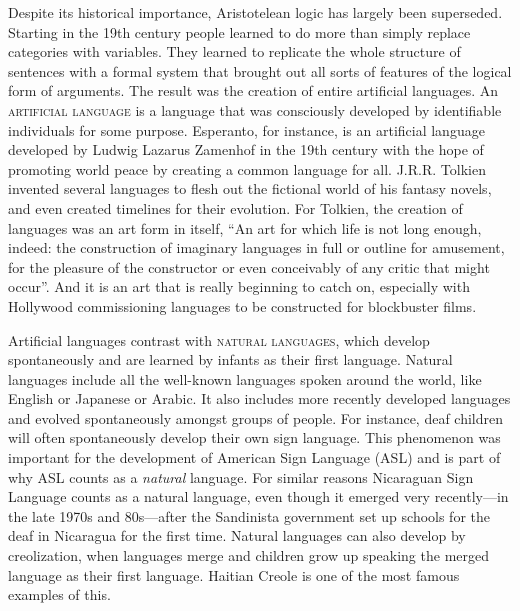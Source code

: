 Despite its historical importance, Aristotelean logic has largely been superseded. Starting in the 19th century people learned to do more than simply replace categories with variables. They learned to replicate the whole structure of sentences with a formal system that brought out all sorts of features of the logical form of arguments. The result was the creation of entire artificial languages. An \textsc{\gls{artificial language}} \label{def:artificial_language} is a language that was consciously developed by identifiable individuals for some purpose. Esperanto, for instance, is an artificial language developed by Ludwig Lazarus Zamenhof in the 19th century with the hope of promoting world peace by creating a common language for all. J.R.R. Tolkien invented several languages to flesh out the fictional world of his fantasy novels, and even created timelines for their evolution. For Tolkien, the creation of languages was an art form in itself, ``An art for which life is not long enough, indeed: the construction of imaginary languages in full or outline for amusement, for the pleasure of the constructor or even conceivably of any critic that might occur''\cite{Tolkien1931}. And it is an art that is really beginning to catch on, especially with Hollywood commissioning languages to be constructed for blockbuster films.

Artificial languages contrast with \textsc{\glspl{natural language}}, \label{def:natural_language} which develop spontaneously and are learned by infants as their first language. Natural languages include all the well-known languages spoken around the world, like English or Japanese or Arabic. It also includes more recently developed languages and evolved spontaneously amongst groups of people. For instance, deaf children will often spontaneously develop their own sign language. This phenomenon was important for the development of American Sign Language (ASL) and is part of why ASL counts as a \textit{natural} language. For similar reasons Nicaraguan Sign Language counts as a natural language, even though it emerged very recently---in the late 1970s and 80s---after the Sandinista government set up schools for the deaf in Nicaragua for the first time. Natural languages can also develop by creolization, when languages merge and children grow up speaking the merged language as their first language. Haitian Creole is one of the most famous examples of this.

